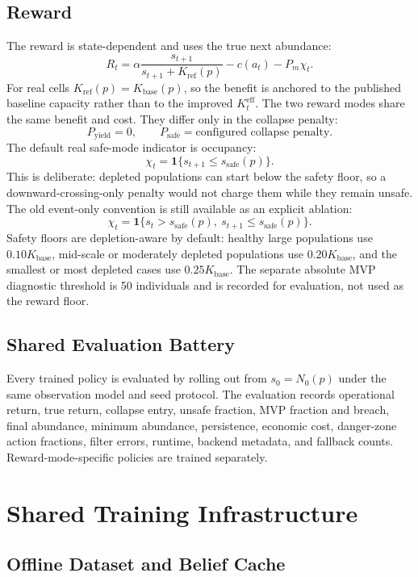 \documentclass[11pt]{article}
\newcommand{\1}{\mathbf{1}}
\begin{document}
\subsection{Reward}

The reward is state-dependent and uses the true next abundance:
\[
  R_t =
  \alpha\frac{s_{t+1}}{s_{t+1}+K_{\mathrm{ref}}(p)}
  - c(a_t)
  - P_m\chi_t.
\]
For real cells $K_{\mathrm{ref}}(p)=K_{\mathrm{base}}(p)$, so the benefit is
anchored to the published baseline capacity rather than to the improved
$K^{\mathrm{eff}}_t$.
The two reward modes share the same benefit and cost.  They differ only in the
collapse penalty:
\[
  P_{\mathrm{yield}}=0,\qquad
  P_{\mathrm{safe}}=\text{configured collapse penalty}.
\]
The default real safe-mode indicator is occupancy:
\[
  \chi_t=\1\{s_{t+1}\le s_{\mathrm{safe}}(p)\}.
\]
This is deliberate: depleted populations can start below the safety floor, so a
downward-crossing-only penalty would not charge them while they remain unsafe.
The old event-only convention is still available as an explicit ablation:
\[
  \chi_t=\1\{s_t>s_{\mathrm{safe}}(p),\ s_{t+1}\le s_{\mathrm{safe}}(p)\}.
\]
Safety floors are depletion-aware by default: healthy large populations use
$0.10K_{\mathrm{base}}$, mid-scale or moderately depleted populations use
$0.20K_{\mathrm{base}}$, and the smallest or most depleted cases use
$0.25K_{\mathrm{base}}$.  The separate absolute MVP diagnostic threshold is
50 individuals and is recorded for evaluation, not used as the reward floor.

\subsection{Shared Evaluation Battery}

Every trained policy is evaluated by rolling out from $s_0=N_0(p)$ under the
same observation model and seed protocol.  The evaluation records operational
return, true return, collapse entry, unsafe fraction, MVP fraction and breach,
final abundance, minimum abundance, persistence, economic cost, danger-zone
action fractions, filter errors, runtime, backend metadata, and fallback counts.
Reward-mode-specific policies are trained separately.

\section{Shared Training Infrastructure}

\subsection{Offline Dataset and Belief Cache}
\end{document}
